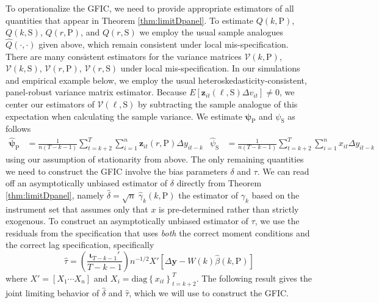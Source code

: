 To operationalize the GFIC, we need to provide appropriate estimators of all quantities that appear in Theorem \ref{thm:limitDpanel}.
To estimate ${Q}(k,\text{P})$, ${Q}(k,\text{S})$, ${Q}(r,\text{P})$, and ${Q}(r,\text{S})$ we employ the usual sample analogues $\widehat{Q}(\cdot,\cdot)$ given above, which remain consistent under local mis-specification.
There are many consistent estimators for the variance matrices $\mathcal{V}(k,\text{P})$, $\mathcal{V}(k,\text{S})$, $\mathcal{V}(r,\text{P})$, $\mathcal{V}(r,\text{S})$ under local mis-specification.
In our simulations and empirical example below, we employ the usual heteroskedasticity-consistent, panel-robust variance matrix estimator.
Because $E[\mathbf{z}_{it}(\ell,\text{S})\Delta v_{it}]\neq 0$, we center our estimators of $\mathcal{V}(\ell, \text{S})$ by subtracting the sample analogue of this expectation when calculating the sample variance.
We estimate $\boldsymbol{\psi}_{\text{P}}$ and $\psi_{\text{S}}$ as follows
\begin{align*}
  \widehat{\boldsymbol{\psi}}_{\text{P}} &= \frac{1}{n(T - k - 1)}\sum_{t = k+2}^T \sum_{i = 1}^n \mathbf{z}_{it}(r,\text{P}) \Delta y_{it-k} &
  \widehat{\psi}_{\text{S}} &= \frac{1}{n(T - k - 1)}\sum_{t = k+2}^T \sum_{i = 1}^n x_{it} \Delta y_{it-k}
\end{align*}
using our assumption of stationarity from above.
The only remaining quantities we need to construct the GFIC involve the bias parameters $\delta$ and $\tau$. 
We can read off an asymptotically unbiased estimator of $\delta$ directly from Theorem \ref{thm:limitDpanel}, namely $\widehat{\delta} = \sqrt{n}\; \widehat{\gamma}_k(k,\text{P})$ the estimator of $\gamma_k$ based on the instrument set that assumes only that $x$ is pre-determined rather than strictly exogenous.
To construct an asymptotically unbiased estimator of $\tau$, we use the residuals from the specification that uses \emph{both} the correct moment conditions and the correct lag specification, specifically
\begin{equation}
  \label{eq:DpanelTau}
  \widehat{\tau} = \left( \frac{\boldsymbol{\iota}_{T-k-1}'}{T - k - 1} \right) n^{-1/2} X' \left[\Delta \mathbf{y} - W(k)\widehat{\beta}(k,\text{P})  \right]
\end{equation}
where $X' = [X_1 \cdots X_n]$ and $X_i = \mbox{diag}\left\{ x_{it} \right\}_{t = k + 2}^{T}$.
The following result gives the joint limiting behavior of $\widehat{\delta}$ and $\widehat{\tau}$, which we will use to construct the GFIC.



